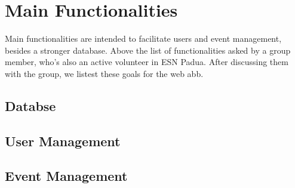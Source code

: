 \section{Main Functionalities}

Main functionalities are intended to facilitate users and event management, besides a stronger database.
Above the list of functionalities asked by a group member, who's also an active volunteer in ESN Padua.
After discussing them  with the group, we listest these goals for the web abb.

\subsection{Databse}

\subsection{User Management}

\subsection{Event Management}